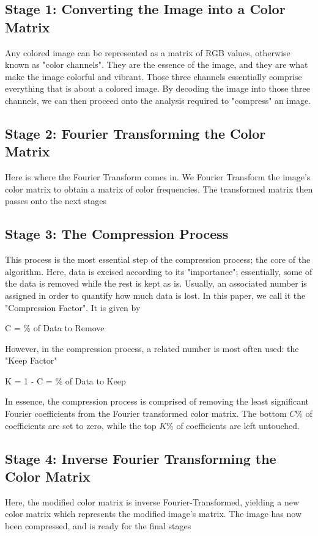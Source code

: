 \documentclass{article}
\begin{document}
\subsection*{Stage 1: Converting the Image into a Color Matrix}
Any colored image can be represented as a matrix of RGB values, otherwise known as "color channels".
They are the essence of the image, and they are what make the image colorful and vibrant. Those three 
channels essentially comprise everything that is about a colored image. By decoding the image into those 
three channels, we can then proceed onto the analysis required to "compress" an image. 

\subsection*{Stage 2: Fourier Transforming the Color Matrix}
Here is where the Fourier Transform comes in. We Fourier Transform the image's color matrix
to obtain a matrix of color frequencies. The transformed matrix then passes onto the next stages

\subsection*{Stage 3: The Compression Process}
This process is the most essential step of the compression process; the core of the algorithm. 
Here, data is excised according to its "importance"; essentially, some of the data is removed 
while the rest is kept as is. Usually, an associated number is assigned in order to quantify 
how much data is lost. In this paper, we call it the "Compression Factor". It is given by

\begin{center}
C = \% of Data to Remove
\end{center}

However, in the compression process, a related number is most often used: the "Keep Factor"

\begin{center}
    K = 1 - C = \% of Data to Keep
\end{center}

In essence, the compression process is comprised of removing the least significant Fourier coefficients
from the Fourier transformed color matrix. The bottom $C$\% of coefficients are set to zero, while the 
top $K$\% of coefficients are left untouched.

\subsection*{Stage 4: Inverse Fourier Transforming the Color Matrix}
Here, the modified color matrix is inverse Fourier-Transformed, yielding a new color matrix which 
represents the modified image's matrix. The image has now been compressed, and is ready for the final stages
\end{document}
